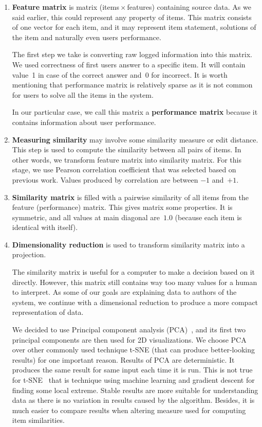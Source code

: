 \documentclass[
  print, %
  table,   %
  nolof,     %
  nolot,     %
  nocover,
  color,
  final,
]{fithesis3}
\begin{document}
\begin{enumerate}
  \item
    \textbf{Feature matrix} is matrix (items\,$\times$\,features) containing source data. As we said earlier, this could represent any property of items. This matrix consists of one vector for each item, and it may represent item statement, solutions of the item and naturally even users performance.

    The first step we take is converting raw logged information into this matrix. We used correctness of first users answer to a specific item. It will contain value~1 in case of the correct answer and~0 for incorrect. It is worth mentioning that performance matrix is relatively sparse as it is not common for users to solve all the items in the system.

    In our particular case, we call this matrix a \textbf{performance matrix} because it contains information about user performance.

  \item
    \textbf{Measuring similarity} may involve some similarity measure or edit distance. This step is used to compute the similarity between all pairs of items. In other words, we transform feature matrix into similarity matrix. For this stage, we use Pearson correlation coefficient that was selected based on previous work. Values produced by correlation are between $-1$ and~$+1$.

  \item
    \textbf{Similarity matrix} is filled with a pairwise similarity of all items from the feature (performance) matrix. This gives matrix some properties. It is symmetric, and all values at main diagonal are~$1.0$ (because each item is identical with itself).

  \item
    \textbf{Dimensionality reduction} is used to transform similarity matrix into a projection.


    The similarity matrix is useful for a computer to make a decision based on it directly. However, this matrix still contains way too many values for a human to interpret. As some of our goals are explaining data to authors of the system, we continue with a dimensional reduction to produce a more compact representation of data.


    We decided to use Principal component analysis (PCA)~\cite{wold1987principal}, and its first two principal components are then used for 2D visualizations. We choose PCA over other commonly used technique t-SNE (that can produce better-looking results) for one important reason. Results of PCA are deterministic. It produces the same result for same input each time it is run. This is not true for t-SNE~\cite{maaten2008visualizing} that is technique using machine learning and gradient descent for finding some local extreme. Stable results are more suitable for understanding data as there is no variation in results caused by the algorithm. Besides, it is much easier to compare results when altering measure used for computing item similarities.


\end{enumerate}
\end{document}

